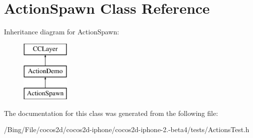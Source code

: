 \hypertarget{interface_action_spawn}{\section{Action\-Spawn Class Reference}
\label{interface_action_spawn}
}
Inheritance diagram for Action\-Spawn\-:\begin{figure}[H]
\begin{center}
\leavevmode
\includegraphics[height=3.000000cm]{interface_action_spawn}
\end{center}
\end{figure}


The documentation for this class was generated from the following file\-:\begin{DoxyCompactItemize}
\item 
/\-Bing/\-File/cocos2d/cocos2d-\/iphone/cocos2d-\/iphone-\/2.-\/beta4/tests/Actions\-Test.\-h\end{DoxyCompactItemize}
